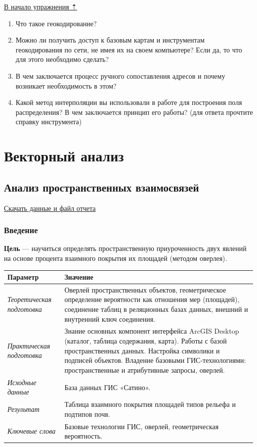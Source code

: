 \documentclass[]{book}
\theoremstyle{definition}
\theoremstyle{definition}
\theoremstyle{definition}
\theoremstyle{remark}
\begin{document}
\protect\hyperlink{geocoding}{В начало упражнения ⇡}

\begin{enumerate}
\def\labelenumi{\arabic{enumi}.}
\item
  Что такое геокодирование?
\item
  Можно ли получить доступ к базовым картам и инструментам
  геокодирования по сети, не имея их на своем компьютере? Если да, то
  что для этого необходимо сделать?
\item
  В чем заключается процесс ручного сопоставления адресов и почему
  возникает необходимость в этом?
\item
  Какой метод интерполяции вы использовали в работе для построения поля
  распределения? В чем заключается принцип его работы? (для ответа
  прочтите справку инструмента)
\end{enumerate}

\hypertarget{part--}{%
\part{Векторный анализ}\label{part--}}

\hypertarget{overlay}{%
\chapter{Анализ пространственных взаимосвязей}\label{overlay}}

\href{http://autolab.geogr.msu.ru/gis/data/Ex10.zip}{Скачать данные и
файл отчета}

\hypertarget{overlay-intro}{%
\section{Введение}\label{overlay-intro}}

\textbf{Цель} --- научиться определять пространственную приуроченность
двух явлений на основе процента взаимного покрытия их площадей (методом
оверлея).

\begin{longtable}[]{@{}ll@{}}
\toprule
Параметр & Значение\tabularnewline
\midrule
\endhead
\emph{Теоретическая подготовка} & Оверлей пространственных объектов,
геометрическое определение вероятности как отношения мер (площадей),
соединение таблиц в реляционных базах данных, внешний и внутренний ключ
соединения.\tabularnewline
\emph{Практическая подготовка} & Знание основных компонент интерфейса
ArcGIS Desktop (каталог, таблица содержания, карта). Работы с базой
пространственных данных. Настройка символики и подписей объектов.
Владение базовыми ГИС-технологиями: пространственные и атрибутивные
запросы, оверлей.\tabularnewline
\emph{Исходные данные} & База данных ГИС «Сатино».\tabularnewline
\emph{Результат} & Таблица взаимного покрытия площадей типов рельефа и
подтипов почв.\tabularnewline
\emph{Ключевые слова} & Базовые технологии ГИС, оверлей, геометрическая
вероятность.\tabularnewline
\bottomrule
\end{longtable}
\end{document}
